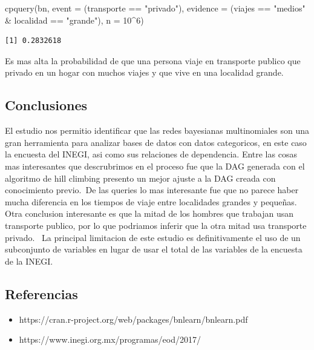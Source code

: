 \documentclass[
  11pt,
  a4paper,
]{article}
\newenvironment{Shaded}{\begin{snugshade}}{\end{snugshade}}
\newcommand{\AttributeTok}[1]{\textcolor[rgb]{0.40,0.45,0.13}{#1}}
\newcommand{\DecValTok}[1]{\textcolor[rgb]{0.68,0.00,0.00}{#1}}
\newcommand{\FunctionTok}[1]{\textcolor[rgb]{0.28,0.35,0.67}{#1}}
\newcommand{\NormalTok}[1]{\textcolor[rgb]{0.00,0.23,0.31}{#1}}
\newcommand{\SpecialCharTok}[1]{\textcolor[rgb]{0.37,0.37,0.37}{#1}}
\newcommand{\StringTok}[1]{\textcolor[rgb]{0.13,0.47,0.30}{#1}}
\providecommand{\tightlist}{%
  \setlength{\itemsep}{0pt}\setlength{\parskip}{0pt}}\usepackage{longtable,booktabs,array}
\begin{document}
\begin{Shaded}
\begin{Highlighting}[numbers=left,,]
\FunctionTok{cpquery}\NormalTok{(bn, }\AttributeTok{event =}\NormalTok{ (transporte }\SpecialCharTok{==} \StringTok{"privado"}\NormalTok{), }\AttributeTok{evidence =}\NormalTok{ (viajes }\SpecialCharTok{==} \StringTok{"medios"} \SpecialCharTok{\&}\NormalTok{ localidad }\SpecialCharTok{==} \StringTok{"grande"}\NormalTok{), }\AttributeTok{n =} \DecValTok{10}\SpecialCharTok{\^{}}\DecValTok{6}\NormalTok{)}
\end{Highlighting}
\end{Shaded}

\begin{verbatim}
[1] 0.2832618
\end{verbatim}

Es mas alta la probabilidad de que una persona viaje en transporte
publico que privado en un hogar con muchos viajes y que vive en una
localidad grande.

\subsection{Conclusiones}\label{conclusiones}

El estudio nos permitio identificar que las redes bayesianas
multinomiales son una gran herramienta para analizar bases de datos con
datos categoricos, en este caso la encuesta del INEGI, asi como sus
relaciones de dependencia. Entre las cosas mas interesantes que
descrubrimos en el proceso fue que la DAG generada con el algoritmo de
hill climbing presento un mejor ajuste a la DAG creada con conocimiento
previo.~De las queries lo mas interesante fue que no parece haber mucha
diferencia en los tiempos de viaje entre localidades grandes y pequeñas.
Otra conclusion interesante es que la mitad de los hombres que trabajan
usan transporte publico, por lo que podriamos inferir que la otra mitad
usa transporte privado.~ La principal limitacion de este estudio es
definitivamente el uso de un subconjunto de variables en lugar de usar
el total de las variables de la encuesta de la INEGI.

\subsection{Referencias}\label{referencias}

\begin{itemize}
\tightlist
\item
  https://cran.r-project.org/web/packages/bnlearn/bnlearn.pdf
\item
  https://www.inegi.org.mx/programas/eod/2017/
\end{itemize}
\end{document}

